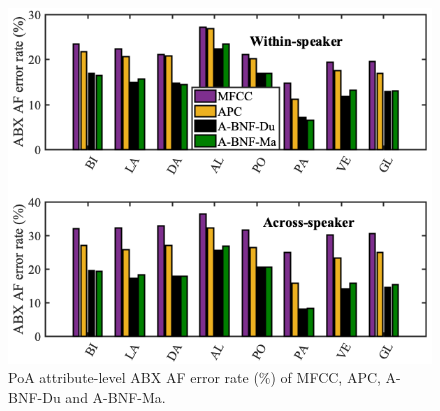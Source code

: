 \documentclass[transmag]{IEEEtran}
\begin{document}
\begin{figure}[!t]
    \centering
    \includegraphics[width= \linewidth]{per_PoA_abx_adjust_journal.png}
    \caption{PoA attribute-level ABX AF error rate ($\%$) of MFCC, APC, A-BNF-Du and A-BNF-Ma.}
    \label{fig:analyses_per_af_poa}
\end{figure}
\end{document}

